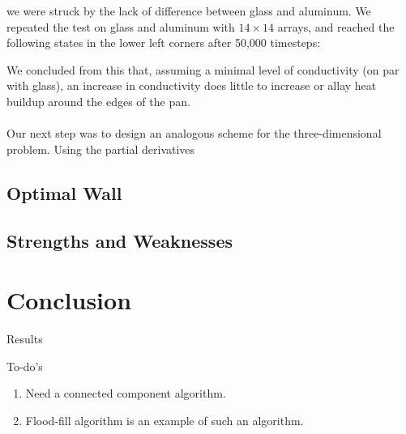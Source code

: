 \documentclass[12pt]{reedmcm}
\begin{document}
we were struck by the lack of difference between glass and aluminum.  We repeated the test on glass and aluminum with $14 \times 14$ arrays, and reached the following states in the lower left corners after 50,000 timesteps:

We concluded from this that, assuming a minimal level of conductivity (on par with glass), an increase in conductivity does little to increase or allay heat buildup around the edges of the pan.\\
\\
Our next step was to design an analogous scheme for the three-dimensional problem.  Using the partial derivatives 

\subsection{Optimal Wall}
\subsection{Strengths and Weaknesses}

\section{Conclusion}
Results

To-do's
\begin{enumerate}
  \item Need a connected component algorithm.
  \item Flood-fill algorithm is an example of such an algorithm.
\end{enumerate}

\renewcommand{\bibname}{References}

\nocite{*}

\end{document}
